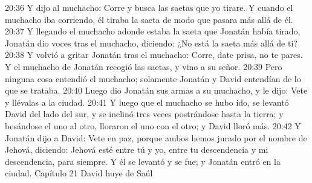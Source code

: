 20:36 Y dijo al muchacho: Corre y busca las saetas que yo tirare. Y cuando el muchacho iba corriendo, él tiraba la saeta de modo que pasara más allá de él.  
20:37 Y llegando el muchacho adonde estaba la saeta que Jonatán había tirado, Jonatán dio voces tras el muchacho, diciendo: ¿No está la saeta más allá de ti?  
20:38 Y volvió a gritar Jonatán tras el muchacho: Corre, date prisa, no te pares. Y el muchacho de Jonatán recogió las saetas, y vino a su señor.  
20:39 Pero ninguna cosa entendió el muchacho; solamente Jonatán y David entendían de lo que se trataba.  
20:40 Luego dio Jonatán sus armas a su muchacho, y le dijo: Vete y llévalas a la ciudad.  
20:41 Y luego que el muchacho se hubo ido, se levantó David del lado del sur, y se inclinó tres veces postrándose hasta la tierra; y besándose el uno al otro, lloraron el uno con el otro; y David lloró más.  
20:42 Y Jonatán dijo a David: Vete en paz, porque ambos hemos jurado por el nombre de Jehová, diciendo: Jehová esté entre tú y yo, entre tu descendencia y mi descendencia, para siempre. Y él se levantó y se fue; y Jonatán entró en la ciudad.  
Capítulo 21
David huye de Saúl  


